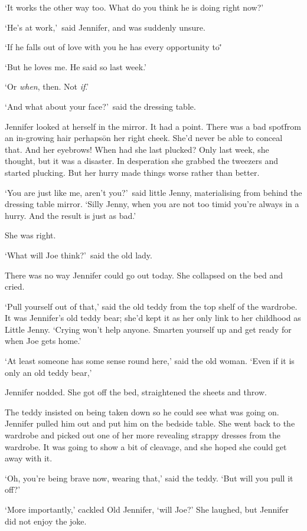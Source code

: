 `It works the other way too. What do you think he is doing right 
now?'

`He's at work,'~said Jennifer, and was suddenly unsure.

`If he falls out of love with you he has every opportunity to\='

`But he loves me. He said so last week.'

`Or \textit{when}, then. Not \textit{if}.'

`And what about your face?'~said the dressing table.

Jennifer looked at herself in the mirror. It had a point. There 
was a bad spot\=from an in-growing hair perhaps\=on her right cheek. 
She'd never be able to conceal that. And her eyebrows! When had 
she last plucked? Only last week, she thought, but it was a 
disaster. In desperation she grabbed the tweezers and started 
plucking. But her hurry made things worse rather than better.

`You are just like me, aren't you?'~said little Jenny, 
materialising from behind the dressing table mirror. `Silly Jenny, 
when you are not too timid you're always in a hurry. And the 
result is just as bad.'

She was right.

`What will Joe think?'~said the old lady.

There was no way Jennifer could go out today. She collapsed on the 
bed and cried.

`Pull yourself out of that,' said the old teddy from the top shelf 
of the wardrobe. It was Jennifer's old teddy bear; she'd kept it 
as her only link to her childhood as Little Jenny. `Crying won't 
help anyone. Smarten yourself up and get ready for when Joe gets 
home.'

`At least someone has some sense round here,' said the old woman.
`Even if it is only an old teddy bear,'

Jennifer nodded. She got off the bed, straightened the sheets and 
throw.

The teddy insisted on being taken down so he could see what was 
going on. Jennifer pulled him out and put him on the bedside 
table. She went back to the wardrobe and picked out one of her 
more revealing strappy dresses from the wardrobe. It was going to 
show a bit of cleavage, and she hoped she could get away with it.

`Oh, you're being brave now, wearing that,' said the teddy. `But 
will you pull it off?'

`More importantly,' cackled Old Jennifer, `will Joe?' She laughed, 
but Jennifer did not enjoy the joke.

